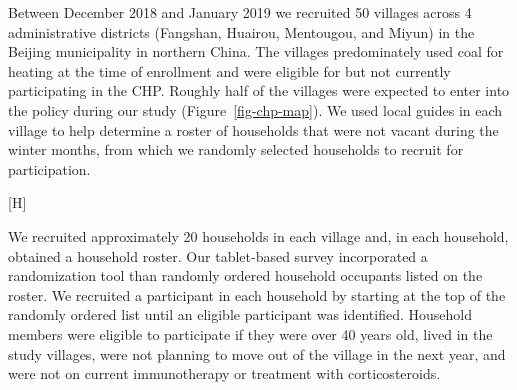 \documentclass[
  letterpaper,
  DIV=11,
  numbers=noendperiod]{scrartcl}
\makeatletter
\renewenvironment{figure}%
   {\renewcommand\familydefault\sfdefault
    \@float{figure}}
   {\end@float}
\makeatother
\begin{document}
Between December 2018 and January 2019 we recruited 50 villages across 4
administrative districts (Fangshan, Huairou, Mentougou, and Miyun) in
the Beijing municipality in northern China. The villages predominately
used coal for heating at the time of enrollment and were eligible for
but not currently participating in the CHP. Roughly half of the villages
were expected to enter into the policy during our study
(Figure~\ref{fig-chp-map}). We used local guides in each
village to help determine a roster of households that were not vacant
during the winter months, from which we randomly selected households to
recruit for participation.

\begin{figure}[H]


\caption{\label{fig-chp-map}Map of village implementation of CHP. Each
circle represents one recruited village. The colors of the circles
indicate the year the villages were exposed to the household energy
transition policy.}

\end{figure}%

We recruited approximately 20 households in each village and, in each
household, obtained a household roster. Our tablet-based
survey incorporated a randomization tool than randomly ordered household
occupants listed on the roster. We recruited a participant in each
household by starting at the top of the randomly ordered list until an
eligible participant was identified. Household members were eligible to
participate if they were over 40 years old, lived in the study villages,
were not planning to move out of the village in the next year, and were
not on current immunotherapy or treatment with corticosteroids.
\end{document}
